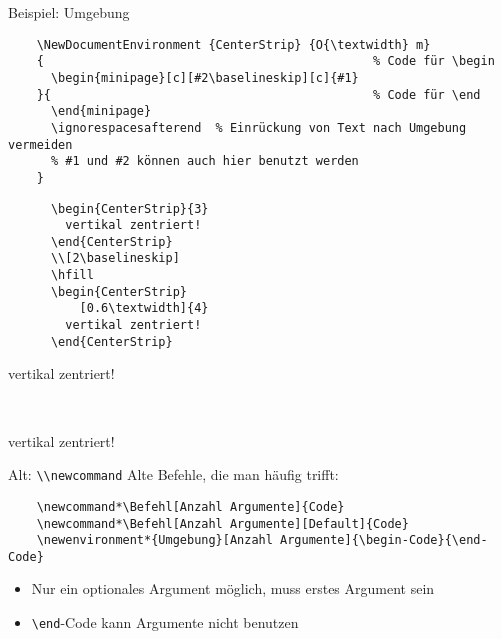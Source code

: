 \begin{frame}[fragile]{Beispiel: Umgebung}
  \begin{lstlisting}
    \NewDocumentEnvironment {CenterStrip} {O{\textwidth} m}
    {                                              % Code für \begin
      \begin{minipage}[c][#2\baselineskip][c]{#1}
    }{                                             % Code für \end
      \end{minipage}
      \ignorespacesafterend  % Einrückung von Text nach Umgebung vermeiden
      % #1 und #2 können auch hier benutzt werden
    }
  \end{lstlisting}

  \begin{CodeExample}{0.5}
    \begin{lstlisting}
      \begin{CenterStrip}{3}
        vertikal zentriert!
      \end{CenterStrip}
      \\[2\baselineskip]
      \hfill
      \begin{CenterStrip}
          [0.6\textwidth]{4}
        vertikal zentriert!
      \end{CenterStrip}
    \end{lstlisting}
  \CodeResult
    \begin{CenterStrip}{3}
      \strut
      vertikal zentriert!
    \end{CenterStrip}
    \\[2\baselineskip]
    \hfill
    \begin{CenterStrip}[0.6\textwidth]{4}
      \strut
      vertikal zentriert!
    \end{CenterStrip}
  \end{CodeExample}
\end{frame}

\begin{frame}[fragile]{Alt: \lstinline[texcsstyle=*\color{white}]+\\newcommand+}
  Alte Befehle, die man häufig trifft:
  \begin{lstlisting}
    \newcommand*\Befehl[Anzahl Argumente]{Code}
    \newcommand*\Befehl[Anzahl Argumente][Default]{Code}
    \newenvironment*{Umgebung}[Anzahl Argumente]{\begin-Code}{\end-Code}
  \end{lstlisting}
  \begin{itemize}
    \item Nur ein optionales Argument möglich, muss erstes Argument sein
    \item \lstinline+\end+-Code kann Argumente nicht benutzen
  \end{itemize}
\end{frame}
